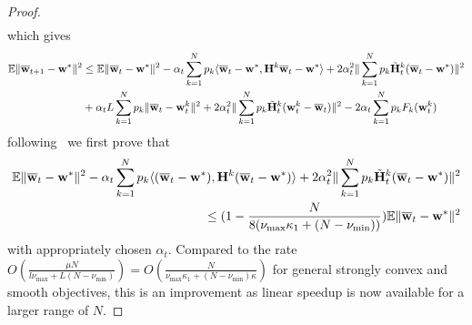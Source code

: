 \begin{proof}
\begin{align*}
	\end{align*}
	which gives 
	\begin{align*}
	\mathbb{E}\|{\overline{\mathbf{w}}}_{t+1}-{\mathbf{w}}^{\ast}\|^{2} & \leq\mathbb{E}\|{\overline{\mathbf{w}}}_{t}-{\mathbf{w}}^{\ast}\|^{2}-\alpha_{t}\sum_{k=1}^{N}p_{k}\langle{\overline{\mathbf{w}}}_{t}-{\mathbf{w}}^{\ast},{\mathbf{H}}^{k}{\overline{\mathbf{w}}}_{t}-{\mathbf{w}}^{\ast}\rangle+2\alpha_{t}^{2}\|\sum_{k=1}^{N}p_{k}\tilde{{\mathbf{H}}}_{t}^{k}({\overline{\mathbf{w}}}_{t}-{\mathbf{w}}^{\ast})\|^{2}\\
	& +\alpha_{t}L\sum_{k=1}^{N}p_{k}\|{\overline{\mathbf{w}}}_{t}-{\mathbf{w}}_{t}^{k}\|^{2}+2\alpha_{t}^{2}\|\sum_{k=1}^{N}p_{k}\tilde{{\mathbf{H}}}_{t}^{k}({\mathbf{w}}_{t}^{k}-{\overline{\mathbf{w}}}_{t})\|^{2}-2\alpha_{t}\sum_{k=1}^{N}p_{k}F_{k}({\mathbf{w}}_{t}^{k})
	\end{align*}
	following~\cite{ma2017power} we first prove that 
	\begin{align*}
	\mathbb{E}\|{\overline{\mathbf{w}}}_{t}-{\mathbf{w}}^{\ast}\|^{2}-\alpha_{t}\sum_{k=1}^{N}p_{k}\langle({\overline{\mathbf{w}}}_{t}-{\mathbf{w}}^{\ast}),{\mathbf{H}}^{k}({\overline{\mathbf{w}}}_{t}-{\mathbf{w}}^{\ast})\rangle+2\alpha_{t}^{2}\|\sum_{k=1}^{N}p_{k}\tilde{{\mathbf{H}}}_{t}^{k}({\overline{\mathbf{w}}}_{t}-{\mathbf{w}}^{\ast})\|^{2}\\
	\leq(1-\frac{N}{8(\nu_{\max}\kappa_{1}+(N-\nu_{\min}))})\mathbb{E}\|{\overline{\mathbf{w}}}_{t}-{\mathbf{w}}^{\ast}\|^{2}
	\end{align*}
	with appropriately chosen $\alpha_{t}$. Compared to the rate $O(\frac{\mu N}{l\nu_{\max}+L(N-\nu_{\min})})=O(\frac{N}{\nu_{\max}\kappa_{1}+(N-\nu_{\min})\kappa})$
	for general strongly convex and smooth objectives, this is an improvement
	as linear speedup is now available for a larger range of $N$. 
	

\end{proof}

